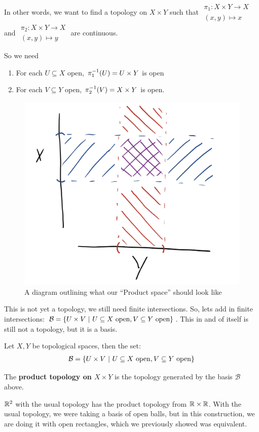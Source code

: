 \documentclass[12pt, twosided]{article}
\begin{document}
    In other words, we want to find a topology on \(X \times Y\) such that \(
    \begin{matrix}
      \pi_1: X \times Y \to X \\ (x, y) \mapsto x
    \end{matrix}
    \) and \(
    \begin{matrix}
      \pi_2: X \times Y \to X \\ (x, y) \mapsto y
    \end{matrix}
    \) are continuous.

    So we need
    \begin{enumerate}
    \item For each \(U \subseteq X\) open, \(\pi_1^{-1}(U) = U \times Y\) is open
    \item For each \(V \subseteq Y\) open, \(\pi_2^{-1}(V) = X \times Y\) is open.
    \end{enumerate}

    \begin{figure}[h]
      \centering
      \includegraphics[width=.5\textwidth]{ProductTop}
      \caption{A diagram outlining what our ``Product space'' should look like}
      \label{fig:prodTop}
    \end{figure}
    This is not yet a topology, we still need finite intersections. So, lets add in finite intersections: \(\mathcal{B} = \opn U \times V \stbar U \subseteq X\ \mathrm{open}, V \subseteq Y\ \mathrm{open} \cls\). This in and of itself is still not a topology, but it is a basis.

    \begin{prop}
      Let \(X, Y\) be topological spaces, then the set:
      \begin{align*}
        \mathcal{B} = \opn U \times V \stbar U \subseteq X\ \mathrm{open}, V \subseteq Y\ \mathrm{open} \cls
      \end{align*}
    \end{prop}

    \begin{df}
      The \textbf{product topology on \(X \times Y\)} is the topology generated by the basis \(\mathcal{B}\) above.
    \end{df}

    \begin{exa}
      \(\mathbb{R}^2\) with the usual topology has the product topology from \(\mathbb{R} \times \mathbb{R}\). With the usual topology, we were taking a basis of open balls, but in this construction, we are doing it with open rectangles, which we previously showed was equivalent.
    \end{exa}
\end{document}
